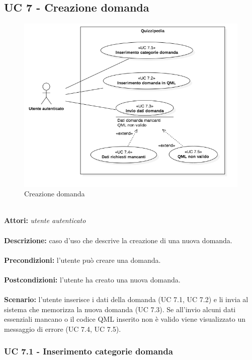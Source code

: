 \documentclass[a4paper,11pt]{article}
\begin{document}
\newpage
\subsection{UC 7 - Creazione domanda}

\begin{figure}[h!]
\centering
\includegraphics[scale=0.6]{../immagini/UC7.png}
\caption{Creazione domanda}
\end{figure}
\ \\
\textbf{Attori:} \textit{utente autenticato}
\\ \\
\textbf{Descrizione:} caso d'uso che descrive la creazione di una nuova domanda.\\
\\
\textbf{Precondizioni:} l'utente può creare una domanda.\\
\\
\textbf{Postcondizioni:} l’utente ha creato una nuova domanda.\\
\\
\textbf{Scenario:} l’utente inserisce i dati della domanda (UC 7.1, UC 7.2) e li invia al sistema che memorizza la nuova domanda (UC 7.3). Se all'invio alcuni dati essenziali mancano o il codice QML inserito non è valido viene visualizzato un messaggio di errore (UC 7.4, UC 7.5).\\


\subsubsection{UC 7.1 - Inserimento categorie domanda}
\end{document}
